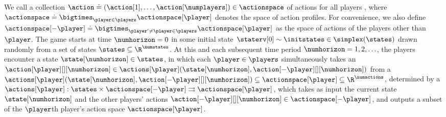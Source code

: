 We call a collection $\action \doteq (\action[1], \hdots, \action[\numplayers]) \in \actionspace$ of actions for all players , where $\actionspace \doteq \bigtimes_{\player \in \players} \actionspace[\player]$ denotes the space of action profiles. 
For convenience, we also define $\actionspace[-\player] \doteq \bigtimes_{\player^\prime \neq \player \in \players} \actionspace[\player]$ as the space of actions of the players other than $\player$. 
\fi
The game starts at time $\numhorizon = 0$ in some initial state $\staterv[0] \sim \initstates \in \simplex (\states)$ drawn randomly from a set of states $\states \subseteq \R^{\numstates}$. 
At this and each subsequent time period $\numhorizon = 1, 2, \hdots$, the players encounter a state $\state[\numhorizon] \in \states$, in which each $\player \in \players$ simultaneously takes an  $\action[\player][][\numhorizon] \in \actions[\player] (\state[\numhorizon], \action[-\player][][\numhorizon])$ from a  $\actions[\player] (\state[\numhorizon], \action[-\player][][\numhorizon]) \subseteq \actionspace[\player] \subseteq \R^{\numactions}$, determined by a  $\actions[\player]: \states\times \actionspace[-\player] \rightrightarrows \actionspace[\player]$, which takes as input the current state $\state[\numhorizon]$ and the other players' actions $\action[-\player][][\numhorizon] \in \actionspace[-\player]$, and outputs a subset of the $\player$th player's action space $\actionspace[\player]$. 
